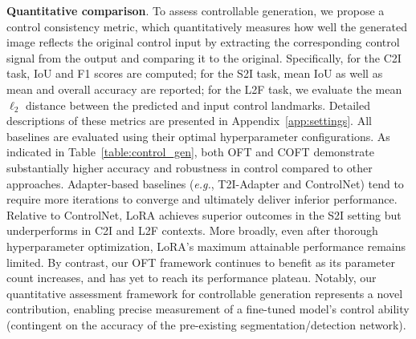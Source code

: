 \textbf{Quantitative comparison}. To assess controllable generation, we propose a control consistency metric, which quantitatively measures how well the generated image reflects the original control input by extracting the corresponding control signal from the output and comparing it to the original. Specifically, for the C2I task, IoU and F1 scores are computed; for the S2I task, mean IoU as well as mean and overall accuracy are reported; for the L2F task, we evaluate the mean $\ell_2$ distance between the predicted and input control landmarks. Detailed descriptions of these metrics are presented in Appendix~\ref{app:settings}. All baselines are evaluated using their optimal hyperparameter configurations. As indicated in Table~\ref{table:control_gen}, both OFT and COFT demonstrate substantially higher accuracy and robustness in control compared to other approaches. Adapter-based baselines (\emph{e.g.}, T2I-Adapter and ControlNet) tend to require more iterations to converge and ultimately deliver inferior performance. Relative to ControlNet, LoRA achieves superior outcomes in the S2I setting but underperforms in C2I and L2F contexts. More broadly, even after thorough hyperparameter optimization, LoRA’s maximum attainable performance remains limited. By contrast, our OFT framework continues to benefit as its parameter count increases, and has yet to reach its performance plateau. Notably, our quantitative assessment framework for controllable generation represents a novel contribution, enabling precise measurement of a fine-tuned model’s control ability (contingent on the accuracy of the pre-existing segmentation/detection network).

